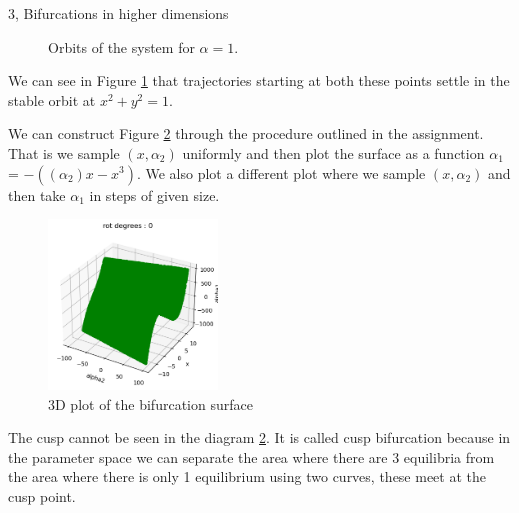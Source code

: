\begin{task}{3, Bifurcations in higher dimensions}
\begin{figure}[H]
    \centering
    \caption{Orbits of the system for $\alpha = 1$.}
    \label{fig:orbits}
\end{figure}

We can see in Figure \ref{fig:orbits} that trajectories starting at both these points settle in the stable orbit at $x^2+y^2 = 1$.

We can construct Figure \ref{fig:f} through the procedure outlined in the assignment. That is we sample $(x, \alpha_2)$ uniformly and then plot the surface as a function $\alpha_1$ = $-((\alpha_2)x - x^3)$. We also plot a different plot where we sample $(x, \alpha_2)$ and then take $\alpha_1$ in steps of given size.

\begin{figure}[H]
    \centering
    \includegraphics[width=0.4\textwidth]{images/fork0.png}
    \caption{3D plot of the bifurcation surface}
    \label{fig:f}
\end{figure}

The cusp cannot be seen in the diagram \ref{fig:f}. It is called cusp bifurcation because in the parameter space we can separate the area where there are 3 equilibria from the area where there is only 1 equilibrium using two curves, these meet at the cusp point.
\end{task}